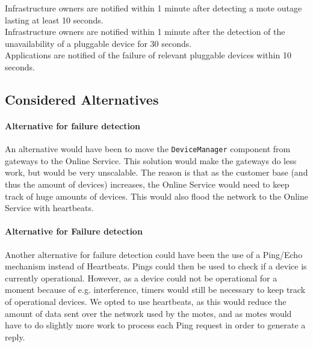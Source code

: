             Infrastructure owners are notified within 1 minute after detecting a mote outage lasting at
            least 10 seconds. \\
            Infrastructure owners are notified within 1 minute after the detection of the unavailability of
            a pluggable device for 30 seconds. \\
            Applications are notified of the failure of relevant pluggable devices within 10 seconds.


    \subsection*{Considered Alternatives}
        \paragraph{Alternative for failure detection}
            An alternative would have been to move the \texttt{DeviceManager}
            component from gateways to the Online Service. This solution would make the
            gateways do less work, but would be very unscalable. The reason is
            that as the customer base (and thus the amount of devices) increases,
            the Online Service would need to keep track of huge amounts of devices.
            This would also flood the network to the Online Service with heartbeats.

        \paragraph{Alternative for Failure detection}
            Another alternative for failure detection could have been the use of
            a Ping/Echo mechanism instead of Heartbeats. Pings could then be used
            to check if a device is currently operational. However, as a device could
            not be operational for a moment because of e.g. interference, timers
            would still be necessary to keep track of operational devices. We opted
            to use heartbeats, as this would reduce the amount of data sent over
            the network used by the motes, and as motes would have to do slightly
            more work to process each Ping request in order to generate a reply.

